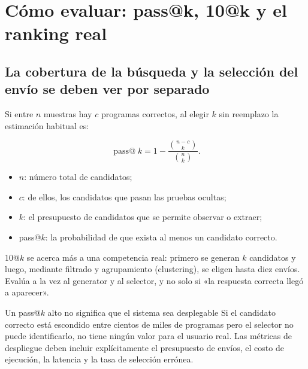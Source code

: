 \section{Cómo evaluar: pass@k, 10@k y el ranking real}

\subsection{La cobertura de la búsqueda y la selección del envío se deben ver por separado}


Si entre $n$ muestras hay $c$ programas correctos, al elegir $k$ sin reemplazo la estimación habitual es:

$$
\operatorname{pass@}k=1-\frac{\binom{n-c}{k}}{\binom{n}{k}}.
$$

\begin{itemize}
    \item $n$: número total de candidatos;
    \item $c$: de ellos, los candidatos que pasan las pruebas ocultas;
    \item $k$: el presupuesto de candidatos que se permite observar o extraer;
    \item pass@$k$: la probabilidad de que exista al menos un candidato correcto.
\end{itemize}

10@$k$ se acerca más a una competencia real: primero se generan $k$ candidatos y luego, mediante filtrado y agrupamiento (clustering), se eligen hasta diez envíos. Evalúa a la vez al generator y al selector, y no solo si «la respuesta correcta llegó a aparecer».


\begin{warningbox}{Un pass@$k$ alto no significa que el sistema sea desplegable}
Si el candidato correcto está escondido entre cientos de miles de programas pero el selector no puede identificarlo, no tiene ningún valor para el usuario real. Las métricas de despliegue deben incluir explícitamente el presupuesto de envíos, el costo de ejecución, la latencia y la tasa de selección errónea.
\end{warningbox}

